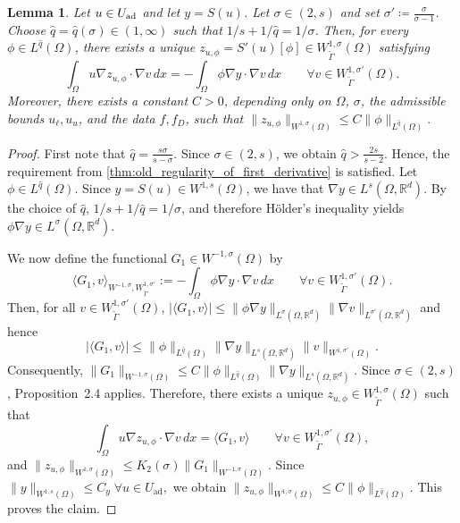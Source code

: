 \documentclass[11pt]{article}
\newcommand{\feas}{U_{\textrm{ad}}}
\newtheorem{lemma}[theorem]{Lemma}
\theoremstyle{definition}
\theoremstyle{remark}
\begin{document}
\begin{lemma}\label{lem:firstvar-Lqtilde}
Let \(u\in U_{\rm ad}\) and let \(y=S(u)\).
Let $\sigma\in(2,s)$ and set $
\sigma' \coloneqq \frac{\sigma}{\sigma-1}$.
Choose \(\hat q=\hat q(\sigma)\in(1,\infty)\) such that
$1/s+1/{\hat q}=1/\sigma$. 
Then, for every \(\phi\in L^{\hat q}(\Omega)\), there exists a unique
$
z_{u,\phi}=S'(u)[\phi]
\in
W^{1,\sigma}_{\tilde\Gamma}(\Omega)
$
satisfying
\[
\int_\Omega
u\nabla z_{u,\phi}\cdot\nabla v\,dx
=
-\int_\Omega
\phi\nabla y\cdot\nabla v\,dx
\qquad
\forall v\in W^{1,\sigma'}_{\tilde\Gamma}(\Omega).
\]
Moreover, there exists a constant \(C>0\), depending only on
\(\Omega\), \(\sigma\), the admissible bounds
\(u_\ell,u_u\), and the data \(f,f_D\), such that
$
\|z_{u,\phi}\|_{W^{1,\sigma}(\Omega)}
\le
C\|\phi\|_{L^{\hat q}(\Omega)}.
$
\end{lemma}
\begin{proof}
First note that
$
\hat q
=
\frac{s\sigma}{s-\sigma}.
$
Since \(\sigma\in(2,s)\), we obtain
$
\hat q
>
\frac{2s}{s-2}.$ 
Hence, the requirement from
\cref{thm:old_regularity_of_first_derivative}
is satisfied. Let \(\phi\in L^{\hat q}(\Omega)\).
Since \(y=S(u)\in W^{1,s}(\Omega)\), we have that $
\nabla y\in L^s(\Omega,\mathbb R^d).$ 
By the choice of \(\hat q\), $1/s+1/{\hat q}=1/\sigma$, 
and therefore Hölder's inequality yields
$\phi\nabla y\in L^\sigma(\Omega,\mathbb R^d)$.

We now define the functional
$
G_1\in W^{-1,\sigma}(\Omega)$ 
by
\[
\langle G_1,v\rangle_{
W^{-1,\sigma},
W^{1,\sigma'}_{\tilde\Gamma}}
:=
-\int_\Omega
\phi\nabla y\cdot\nabla v\,dx
\qquad
\forall
v\in W^{1,\sigma'}_{\tilde\Gamma}(\Omega).
\]
Then, for all
\(v\in W^{1,\sigma'}_{\tilde\Gamma}(\Omega)\),
$
|\langle G_1,v\rangle|
\le
\|\phi\nabla y\|_{L^\sigma(\Omega,\mathbb R^d)}
\|\nabla v\|_{L^{\sigma'}(\Omega,\mathbb R^d)}
$
and hence
\[
|\langle G_1,v\rangle|
\le
\|\phi\|_{L^{\hat q}(\Omega)}
\|\nabla y\|_{L^s(\Omega,\mathbb R^d)}
\|v\|_{W^{1,\sigma'}(\Omega)}.
\]
Consequently,
$
\|G_1\|_{W^{-1,\sigma}(\Omega)}
\le
C
\|\phi\|_{L^{\hat q}(\Omega)}
\|\nabla y\|_{L^s(\Omega,\mathbb R^d)}.$ Since \(\sigma\in(2,s)\), Proposition~2.4 applies.
Therefore, there exists a unique
$
z_{u,\phi}\in
W^{1,\sigma}_{\tilde\Gamma}(\Omega)$ 
such that
\[
\int_\Omega
u\nabla z_{u,\phi}\cdot\nabla v\,dx
=
\langle G_1,v\rangle
\qquad
\forall
v\in W^{1,\sigma'}_{\tilde\Gamma}(\Omega),
\]
and
$
\|z_{u,\phi}\|_{W^{1,\sigma}(\Omega)}
\le
K_2(\sigma)
\|G_1\|_{W^{-1,\sigma}(\Omega)}.$
Since
$
\|y\|_{W^{1,s}(\Omega)}
\le
C_y
\;
\forall u\in\feas,$ 
we  obtain
$
\|z_{u,\phi}\|_{W^{1,\sigma}(\Omega)}
\le
C
\|\phi\|_{L^{\hat q}(\Omega)}.
$
This proves the claim.
\end{proof}
\end{document}
